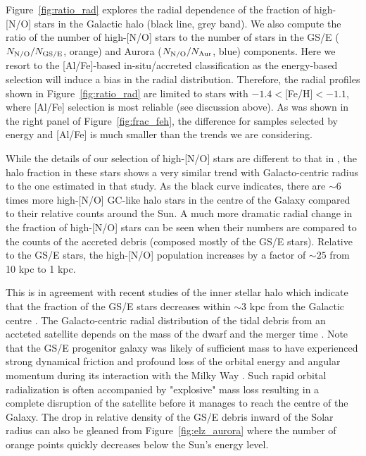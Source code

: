 \documentclass[a4paper,useAMS,usenatbib]{mnras}
\begin{document}
Figure~\ref{fig:ratio_rad} explores the radial dependence of the fraction of high-[N/O] stars in the Galactic halo (black line, grey band). We also compute the ratio of the number of high-[N/O] stars to the number of stars in the GS/E ($N_{\rm N/O}/N_{\rm GS/E}$, orange) and Aurora ($N_{\rm N/O}/N_{\rm Aur}$, blue) components. Here we resort to the [Al/Fe]-based in-situ/accreted classification as the energy-based selection will induce a bias in the radial distribution. Therefore, the radial profiles shown in Figure~\ref{fig:ratio_rad} are limited to stars with $-1.4<$[Fe/H]$<-1.1$, where [Al/Fe] selection is most reliable (see discussion above). As was shown in the right panel of Figure~\ref{fig:frac_feh}, the difference for samples selected by energy and [Al/Fe] is much smaller than the trends we are considering. 

While the details of our selection of high-[N/O] stars are different to that in \citet{Horta2021}, the halo fraction in these stars shows a very similar trend with Galacto-centric radius to the one estimated in that study. As the black curve indicates, there are $\sim6$ times more high-[N/O] GC-like halo stars in the centre of the Galaxy compared to their relative counts around the Sun. A much more dramatic radial change in the fraction of high-[N/O] stars can be seen when their numbers are compared to the counts of the accreted debris (composed mostly of the GS/E stars). Relative to the GS/E stars, the high-[N/O] population increases by a factor of $\sim 25$ from 10 kpc to 1 kpc. 

This is in agreement with recent studies of the inner stellar halo which indicate that the fraction of the GS/E stars decreases within $\sim3$ kpc from the Galactic centre \citep[see][]{Iorio2021,wrinkles}. The Galacto-centric radial distribution of the tidal debris from an accteted satellite depends on the mass of the dwarf and the merger time \citep[see][]{Deason2013,Horta_FIRE}. Note that the GS/E progenitor galaxy was likely of sufficient mass to have experienced strong dynamical friction and profound loss of the orbital energy and angular momentum during its interaction with the Milky Way \citep[see discussion in][]{radialize}. Such rapid orbital radialization is often accompanied by "explosive" mass loss resulting in a complete disruption of the satellite before it manages to reach the centre of the Galaxy. The drop in relative density of the GS/E debris inward of the Solar radius can also be gleaned from Figure~\ref{fig:elz_aurora} where the number of orange points quickly decreases below the Sun's energy level.
\end{document}
